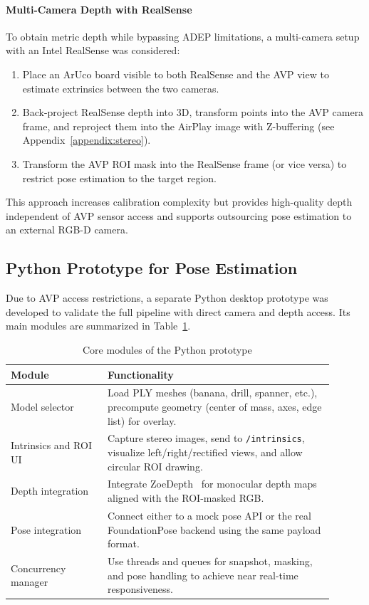\paragraph*{Multi-Camera Depth with RealSense}

To obtain metric depth while bypassing ADEP limitations, a multi-camera setup with an Intel RealSense was considered:

\begin{enumerate}
    \item Place an ArUco board visible to both RealSense and the AVP view to estimate extrinsics between the two cameras.
    \item Back-project RealSense depth into 3D, transform points into the AVP camera frame, and reproject them into the AirPlay image with Z-buffering (see Appendix~\ref{appendix:stereo}).
    \item Transform the AVP ROI mask into the RealSense frame (or vice versa) to restrict pose estimation to the target region.
\end{enumerate}

This approach increases calibration complexity but provides high-quality depth independent of AVP sensor access and supports outsourcing pose estimation to an external RGB-D camera.

\subsection{Python Prototype for Pose Estimation}
\label{subsec:python-prototype}

Due to AVP access restrictions, a separate Python desktop prototype was developed to validate the full pipeline with direct camera and depth access. Its main modules are summarized in Table~\ref{tab:python-modules}.

\begin{table}[H]
    \centering
    \caption{Core modules of the Python prototype}
    \label{tab:python-modules}
    \begin{tabular}{p{0.27\linewidth}p{0.63\linewidth}}
        \toprule
        \textbf{Module} & \textbf{Functionality} \\
        \midrule
        Model selector &
        Load PLY meshes (banana, drill, spanner, etc.), precompute geometry (center of mass, axes, edge list) for overlay. \\
        Intrinsics and ROI UI &
        Capture stereo images, send to \texttt{/intrinsics}, visualize left/right/rectified views, and allow circular ROI drawing. \\
        Depth integration &
        Integrate ZoeDepth~\cite{bhat2023zoedepth} for monocular depth maps aligned with the ROI-masked RGB. \\
        Pose integration &
        Connect either to a mock pose API or the real FoundationPose backend using the same payload format. \\
        Concurrency manager &
        Use threads and queues for snapshot, masking, and pose handling to achieve near real-time responsiveness. \\
        \bottomrule
    \end{tabular}
\end{table}


